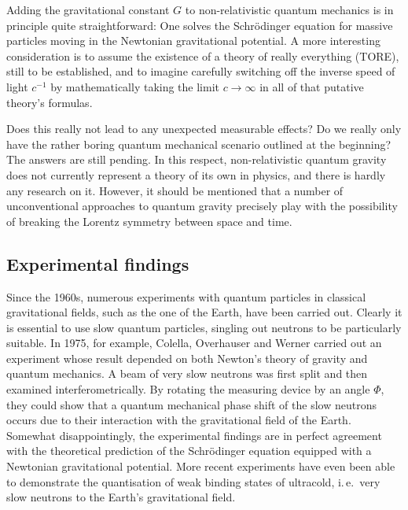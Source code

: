 \documentclass{scrartcl}
\begin{document}
\newpage {}
\label{sec:1010}

Adding the gravitational constant $G$ to non-relativistic quantum mechanics is in principle quite straightforward: One solves the Schrödinger equation for massive particles moving in the Newtonian gravitational potential. A more interesting consideration is to assume the existence of a theory of really everything (TORE), still to be established, and to imagine carefully switching off the inverse speed of light $c^{−1}$ by mathematically taking the limit $c\rightarrow\infty$ in all of that putative theory's formulas.

Does this really not lead to any unexpected measurable effects? Do we really only have the rather boring quantum mechanical scenario outlined at the beginning? The answers are still pending. In this respect, non-relativistic quantum gravity does not currently represent a theory of its own in physics, and there is hardly any research on it. However, it should be mentioned that a number of unconventional approaches to quantum gravity precisely play with the possibility of breaking the Lorentz symmetry between space and time.


\subsection*{Experimental findings}

Since the 1960s, numerous experiments with quantum particles in classical gravitational fields, such as the one of the Earth, have been carried out. Clearly it is essential to use slow quantum particles, singling out neutrons to be particularly suitable. In 1975, for example, Colella, Overhauser and Werner carried out an experiment whose result depended on both Newton's theory of gravity and quantum mechanics. A beam of very slow neutrons was first split and then examined interferometrically. By rotating the measuring device by an angle $\Phi$, they could show that a quantum mechanical phase shift of the slow neutrons occurs due to their interaction with the gravitational field of the Earth. Somewhat disappointingly, the experimental findings are in perfect agreement with the theoretical prediction of the Schrödinger equation equipped with a Newtonian gravitational potential. More recent experiments have even been able to demonstrate the quantisation of weak binding states of ultracold, i.\,e.\ very slow neutrons to the Earth's gravitational field.
\end{document}
